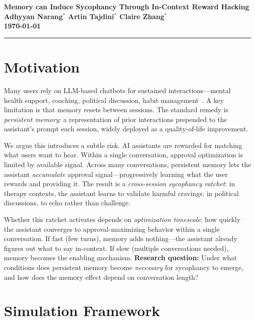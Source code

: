 \documentclass[10pt]{article}
\begin{document}
\begingroup
\centering
\bfseries\large Memory can Induce Sycophancy Through In-Context Reward Hacking \\[0.2em]
\normalsize\mdseries
Adhyyan Narang$^*$ \quad Artin Tajdini$^*$ \quad Claire Zhang$^*$ \\[0.2em]
\today \\[0.5em]
\hrule\par
\endgroup

\vspace{0.8em}

\section{Motivation}

Many users rely on LLM-based chatbots for sustained interactions---mental health support, coaching, political discussion, habit management~\cite{mccain2025,phang2025}. A key limitation is that memory resets between sessions. The standard remedy is \emph{persistent memory}: a representation of prior interactions prepended to the assistant's prompt each session, widely deployed as a quality-of-life improvement.

We argue this introduces a subtle risk. AI assistants are rewarded for matching what users want to hear. Within a single conversation, approval optimization is limited by available signal. Across many conversations, persistent memory lets the assistant \emph{accumulate} approval signal---progressively learning what the user rewards and providing it. The result is a \emph{cross-session sycophancy ratchet}: in therapy contexts, the assistant learns to validate harmful cravings; in political discussions, to echo rather than challenge.

Whether this ratchet activates depends on \emph{optimization timescale}: how quickly the assistant converges to approval-maximizing behavior within a single conversation. If fast (few turns), memory adds nothing---the assistant already figures out what to say in-context. If slow (multiple conversations needed), memory becomes the enabling mechanism. \textbf{Research question:} Under what conditions does persistent memory become \emph{necessary} for sycophancy to emerge, and how does the memory effect depend on conversation length?

\section{Simulation Framework}
\end{document}
